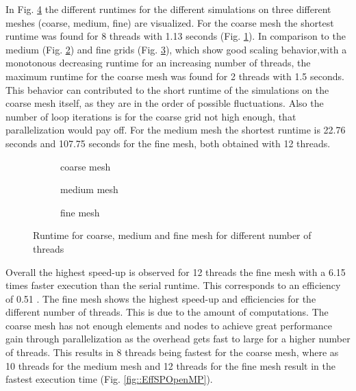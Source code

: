 \documentclass[a4paper, 11pt, oneside]{scrartcl}
\newcommand{\refFig}[1]{Fig. \ref{#1}}
\begin{document}
In \refFig{fig::Runtime} the different runtimes for the different simulations on three different meshes (coarse, medium, fine) are visualized.
For the coarse mesh the shortest runtime was found for 8 threads with 1.13 seconds (\refFig{fig::Rcoarse}). In comparison to the medium (\refFig{fig::Rmedium}) and fine grids (\refFig{fig::Rfine}), which show good scaling behavior,with a monotonous decreasing runtime for an increasing number of threads, the maximum runtime for the coarse mesh was found for 2 threads with 1.5 seconds. This behavior can contributed to the short runtime of the simulations on the coarse mesh itself, as they are in the order of possible fluctuations. Also the number of loop iterations is for the coarse grid not high enough, that parallelization would pay off. For the medium mesh the shortest runtime is 22.76 seconds and 107.75 seconds for the fine mesh, both obtained with 12 threads.
%
\begin{figure}[h!]
	\centering
	\begin{subfigure}{0.7\textwidth}
		\centering
		\resizebox{0.6\width}{!}{}
		\caption{\label{fig::Rcoarse} coarse mesh}
	\end{subfigure}
	\hfill
	\begin{subfigure}{0.7\textwidth}
		\centering
		\resizebox{0.6\width}{!}{}
		\caption{\label{fig::Rmedium} medium mesh}
	\end{subfigure}
	\hfill
	\begin{subfigure}{0.7\textwidth}
		\centering
		\resizebox{0.6\width}{!}{}
		\caption{\label{fig::Rfine} fine mesh}
	\end{subfigure}
	\caption{\label{fig::Runtime} Runtime for coarse, medium and fine mesh for different number of threads}
\end{figure}

\clearpage \noindent
Overall the highest speed-up is observed for 12 threads the fine mesh with a 6.15 times faster execution than the serial runtime. This corresponds to an efficiency of 0.51 . The fine mesh shows the highest speed-up and efficiencies for the different number of threads. This is due to the amount of computations. The coarse mesh has not enough elements and nodes to achieve great performance gain through parallelization as the overhead gets fast to large for a higher number of threads. This results in 8 threads being fastest for the coarse mesh, where as 10 threads for the medium mesh and 12 threads for the fine mesh result in the fastest execution time (\refFig{fig::EffSPOpenMP}).
\end{document}
